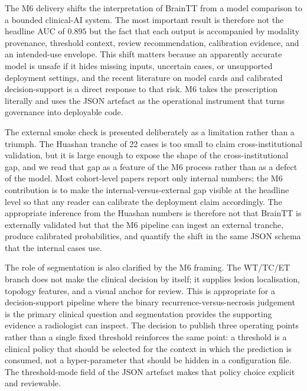 \documentclass[11pt,a4paper]{article}
\begin{document}
The M6 delivery shifts the interpretation of BrainTT from a model comparison to a bounded clinical-AI system. The most important result is therefore not the headline AUC of $0.895$ but the fact that each output is accompanied by modality provenance, threshold context, review recommendation, calibration evidence, and an intended-use envelope. This shift matters because an apparently accurate model is unsafe if it hides missing inputs, uncertain cases, or unsupported deployment settings, and the recent literature on model cards and calibrated decision-support is a direct response to that risk. M6 takes the prescription literally and uses the JSON artefact as the operational instrument that turns governance into deployable code.

The external smoke check is presented deliberately as a limitation rather than a triumph. The Huashan tranche of 22 cases is too small to claim cross-institutional validation, but it is large enough to expose the shape of the cross-institutional gap, and we read that gap as a feature of the M6 process rather than as a defect of the model. Most cohort-level papers report only internal numbers; the M6 contribution is to make the internal-versus-external gap visible at the headline level so that any reader can calibrate the deployment claim accordingly. The appropriate inference from the Huashan numbers is therefore not that BrainTT is externally validated but that the M6 pipeline can ingest an external tranche, produce calibrated probabilities, and quantify the shift in the same JSON schema that the internal cases use.

The role of segmentation is also clarified by the M6 framing. The WT/TC/ET branch does not make the clinical decision by itself; it supplies lesion localisation, topology features, and a visual anchor for review. This is appropriate for a decision-support pipeline where the binary recurrence-versus-necrosis judgement is the primary clinical question and segmentation provides the supporting evidence a radiologist can inspect. The decision to publish three operating points rather than a single fixed threshold reinforces the same point: a threshold is a clinical policy that should be selected for the context in which the prediction is consumed, not a hyper-parameter that should be hidden in a configuration file. The threshold-mode field of the JSON artefact makes that policy choice explicit and reviewable.
\end{document}
